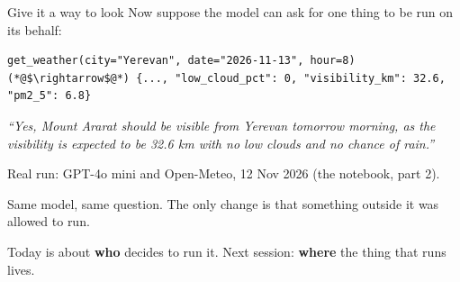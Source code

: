 \documentclass[aspectratio=169]{beamer}
\begin{document}
\begin{frame}[fragile]{Give it a way to look}
  \vspace{0.6em}
  Now suppose the model can ask for one thing to be run on its behalf:

  \begin{lstlisting}
get_weather(city="Yerevan", date="2026-11-13", hour=8)
(*@$\rightarrow$@*) {..., "low_cloud_pct": 0, "visibility_km": 32.6, "pm2_5": 6.8}
\end{lstlisting}

  \vspace{0.4em}
  \begin{center}
  \begin{tcolorbox}[colback=paramgreen!8, colframe=paramgreen, boxrule=0.6pt, arc=2pt,
                    width=0.86\textwidth]
    \centering\small\textit{``Yes, Mount Ararat should be visible from Yerevan tomorrow morning, as the
    visibility is expected to be 32.6 km with no low clouds and no chance of rain.''}
  \end{tcolorbox}
  \end{center}
  {\scriptsize\color{gray}Real run: GPT-4o mini and Open-Meteo, 12 Nov 2026 (the notebook, part 2).}

  \vspace{0.6em}
  Same model, same question. The only change is that something outside it was allowed to run.

  \vspace{0.5em}
  \begin{center}
  {\small\color{gray}Today is about \textbf{who} decides to run it. Next session: \textbf{where} the
  thing that runs lives.}
  \end{center}
\end{frame}
\end{document}
